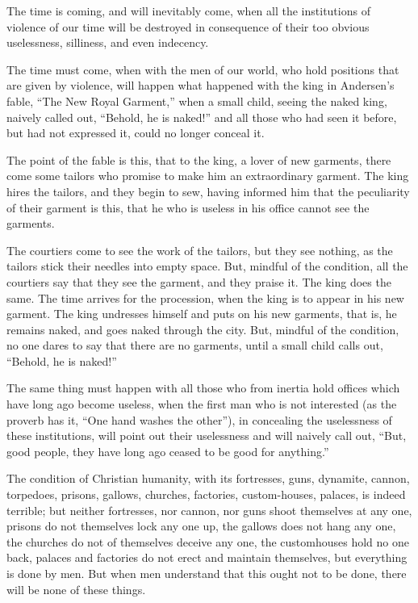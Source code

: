 \documentclass{book}
\begin{document}
The time is coming, and will inevitably come, when all the institutions of violence of our time will be destroyed in consequence of their too obvious uselessness, silliness, and even indecency.

The time must come, when with the men of our world, who hold positions that are given by violence, will happen what happened with the king in Andersen’s fable, “The New Royal Garment,” when a small child, seeing the naked king, naively called out, “Behold, he is naked!” and all those who had seen it before, but had not expressed it, could no longer conceal it.

The point of the fable is this, that to the king, a lover of new garments, there come some tailors who promise to make him an extraordinary garment. The king hires the tailors, and they begin to sew, having informed him that the peculiarity of their garment is this, that he who is useless in his office cannot see the garments.

The courtiers come to see the work of the tailors, but they see nothing, as the tailors stick their needles into empty space. But, mindful of the condition, all the courtiers say that they see the garment, and they praise it. The king does the same. The time arrives for the procession, when the king is to appear in his new garment. The king undresses himself and puts on his new garments, that is, he remains naked, and goes naked through the city. But, mindful of the condition, no one dares to say that there are no garments, until a small child calls out, “Behold, he is naked!”

The same thing must happen with all those who from inertia hold offices which have long ago become useless, when the first man who is not interested (as the proverb has it, “One hand washes the other”), in concealing the uselessness of these institutions, will point out their uselessness and will naively call out, “But, good people, they have long ago ceased to be good for anything.”

The condition of Christian humanity, with its fortresses, guns, dynamite, cannon, torpedoes, prisons, gallows, churches, factories, custom-houses, palaces, is indeed terrible; but neither fortresses, nor cannon, nor guns shoot themselves at any one, prisons do not themselves lock any one up, the gallows does not hang any one, the churches do not of themselves deceive any one, the customhouses hold no one back, palaces and factories do not erect and maintain themselves, but everything is done by men. But when men understand that this ought not to be done, there will be none of these things.
\end{document}
